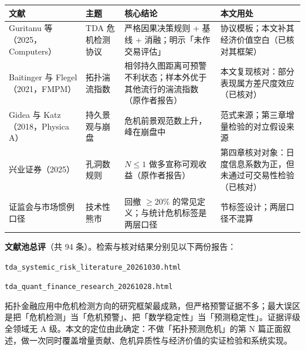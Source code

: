 \documentclass[12pt,a4paper]{ctexart}
\begin{document}
\begin{center}\small
\begin{tabularx}{\textwidth}{>{\raggedright\arraybackslash}X>{\raggedright\arraybackslash}X>{\raggedright\arraybackslash}X>{\raggedright\arraybackslash}X}
\toprule
\textbf{文献} & \textbf{主题} & \textbf{核心结论} & \textbf{本文用处} \\
\midrule
Guritanu 等（2025，Computers） & TDA 危机检测协议 & 严格因果决策规则 + 基线 + 消融；明示「未作交易评估」 & 协议模板；本文补其经济价值空白（已核对其框架） \\
Baitinger 与 Flegel（2021，FMPM） & 拓扑湍流指数 & 相邻持久图距离可预警不利状态；样本外优于其他流行的湍流指数（原作者报告） & 本文复现核对：部分表现属方差尺度效应（已核对） \\
Gidea 与 Katz（2018，Physica A） & 持久景观与崩盘 & 危机前景观范数上升，峰在崩盘中 & 范式来源；第三章增量检验的对立假设来源 \\
兴业证券（2025） & 孔洞数规则 & \(N \le 1\) 做多宣称可观收益（原作者报告） & 第四章核对对象：日度信息系数为正，但未通过可交易性检验（已核对） \\
证监会与市场惯例口径 & 技术性熊市 & 回撤 \(\geq\)20\% 的常见定义；与统计危机标签是两层口径 & 3.1 节标签设计；两层口径不混算 \\
\bottomrule
\end{tabularx}
\end{center}
\textbf{文献池总评}（共 94 条）。检索与核对结果分别见以下两份报告：\par
\noindent\texttt{tda\_systemic\_risk\_literature\_20261030.html}\par
\noindent\texttt{tda\_quant\_finance\_research\_20261028.html}\par
拓扑金融应用中危机检测方向的研究框架最成熟，但严格预警证据不多；最大误区是把「危机检测」当「危机预警」、把「数学稳定性」当「预测稳定性」。证据评级全领域无 A 级。本文的定位由此确定：不做「拓扑预测危机」的第 N 篇正面叙述，做一次同时覆盖增量贡献、危机异质性与经济价值的实证检验和系统实现。\par
\end{document}
